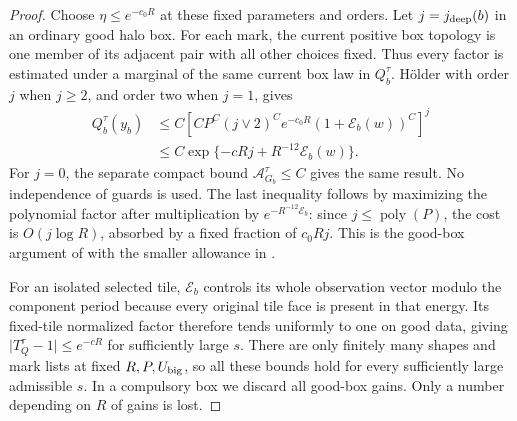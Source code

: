 \begin{proof}
Choose \(\eta\le e^{-c_0R}\) at these fixed parameters and orders.
Let \(j=j_{\rm deep}(b)\) in an ordinary good halo box.  For each
mark, the current positive box topology is one member of its
adjacent pair with all other choices fixed.  Thus every factor is
estimated under a marginal of the same current box law in
\(Q_b^\tau\).  H\"older with order \(j\) when \(j\ge2\), and order
two when \(j=1\), gives
\begin{equation}\label{ent:good-box}
\begin{split}
 Q_b^\tau(y_b)
 &\le C\left[CP^C(j\vee2)^Ce^{-c_0R}
                    (1+\mathcal E_b(w))^C\right]^j\\
 &\le C\exp\{-cRj+R^{-12}\mathcal E_b(w)\}.
\end{split}
\end{equation}
For \(j=0\), the separate compact bound
\(\mathcal A_{G_b}^\tau\le C\) gives the same result.  No independence
of guards is used.  The last inequality follows by maximizing the
polynomial factor after multiplication by
\(e^{-R^{-12}\mathcal E_b}\): since \(j\le\operatorname{poly}(P)\),
the cost is \(O(j\log R)\), absorbed by a fixed fraction of
\(c_0Rj\).  This is the good-box argument of \cite[Section~9]{B}
with the smaller allowance in \cite[Equation~(5.20)]{C}.

For an isolated selected tile, \(\mathcal E_b\) controls its whole
observation vector modulo the component period because every original
tile face is present in that energy.  Its fixed-tile normalized factor
therefore tends uniformly to one on good data, giving
\(\lvert T_Q^\tau-1\rvert\le e^{-cR}\) for sufficiently large \(s\).
There are only finitely many shapes and mark lists at fixed
\(R,P,U_{\rm big}\), so all these bounds hold for every sufficiently
large admissible \(s\).  In a compulsory box we discard all
good-box gains.  Only a number depending on \(R\) of gains is lost.


\end{proof}
